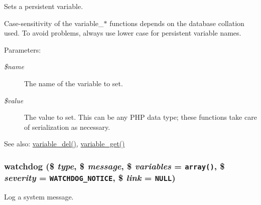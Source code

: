 Sets a persistent variable.

Case-sensitivity of the variable\_\-$\ast$ functions depends on the database collation used. To avoid problems, always use lower case for persistent variable names.

\begin{Desc}
\item[Parameters:]
\begin{description}
\item[{\em \$name}]The name of the variable to set. \item[{\em \$value}]The value to set. This can be any PHP data type; these functions take care of serialization as necessary.\end{description}
\end{Desc}
\begin{Desc}
\item[See also:]\hyperlink{bootstrap_8inc_7850bff5f313f85335f418e6d87606b1}{variable\_\-del()}, \hyperlink{bootstrap_8inc_ba5d67193d1f9d9fd4636cff54fc4154}{variable\_\-get()} \end{Desc}
\hypertarget{bootstrap_8inc_cb7338e6740302727043d64e3ae1257b}{
\subsubsection[{watchdog}]{\setlength{\rightskip}{0pt plus 5cm}watchdog (\$ {\em type}, \/  \$ {\em message}, \/  \$ {\em variables} = {\tt array()}, \/  \$ {\em severity} = {\tt {\bf WATCHDOG\_\-NOTICE}}, \/  \$ {\em link} = {\tt NULL})}}
\label{bootstrap_8inc_cb7338e6740302727043d64e3ae1257b}


Log a system message.

